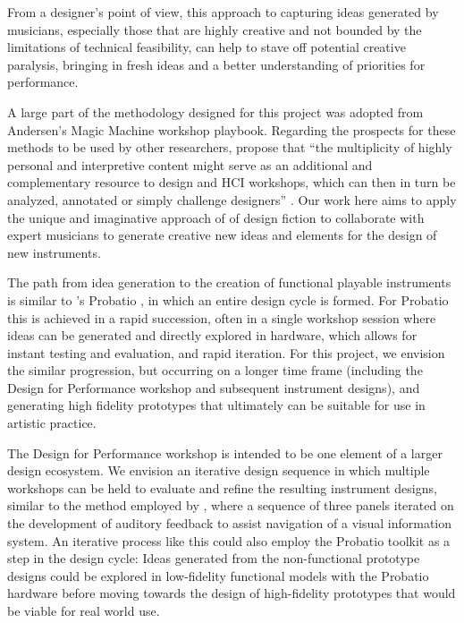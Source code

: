 \documentclass[letterpaper, 12pt]{article}
\begin{document}
From a designer's point of view, this approach to capturing ideas generated by musicians, especially those that are highly creative and not bounded by the limitations of technical feasibility, can help to stave off potential creative paralysis, bringing in fresh ideas and a better understanding of priorities for performance.

A large part of the methodology designed for this project was adopted from Andersen's Magic Machine workshop playbook. Regarding the prospects for these methods to be used by other researchers, \citeauthor{Andersen2019} propose that ``the multiplicity of highly personal and interpretive content might serve as an additional and complementary resource to design and HCI workshops, which can then in turn be analyzed, annotated or simply challenge designers'' \citeyear[p. 12]{Andersen2019}. Our work here aims to apply the unique and imaginative approach of of design fiction to collaborate with expert musicians to generate creative new ideas and elements for the design of new instruments. 


The path from idea generation to the creation of functional playable instruments is similar to \citeauthor{Calegario2019}'s Probatio \citeyearpar{Calegario2019}, in which an entire design cycle is formed. For Probatio this is achieved in a rapid succession, often in a single workshop session where ideas can be generated and directly explored in hardware, which allows for instant testing and evaluation, and rapid iteration. For this project, we envision the similar progression, but occurring on a longer time frame (including the Design for Performance workshop and subsequent instrument designs), and generating high fidelity prototypes that ultimately can be suitable for use in artistic practice. 

The Design for Performance workshop is intended to be one element of a larger design ecosystem. We envision an iterative design sequence in which multiple workshops can be held to evaluate and refine the resulting instrument designs, similar to the method employed by \citet{Absar2015}, where a sequence of three panels iterated on the development of auditory feedback to assist navigation of a visual information system. An iterative process like this could also employ the Probatio toolkit as a step in the design cycle: Ideas generated from the non-functional prototype designs could be explored in low-fidelity functional models with the Probatio hardware before moving towards the design of high-fidelity prototypes that would be viable for real world use.
\end{document}
